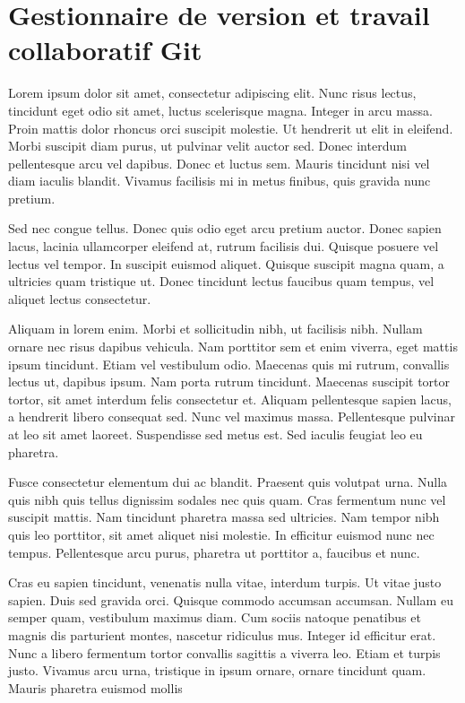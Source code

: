 \documentclass{report}
\begin{document}
        \section{Gestionnaire de version et travail collaboratif Git}
            Lorem ipsum dolor sit amet, consectetur adipiscing elit. Nunc risus lectus, tincidunt eget odio sit amet, luctus scelerisque magna. Integer in arcu massa. Proin mattis dolor rhoncus orci suscipit molestie. Ut hendrerit ut elit in eleifend. Morbi suscipit diam purus, ut pulvinar velit auctor sed. Donec interdum pellentesque arcu vel dapibus. Donec et luctus sem. Mauris tincidunt nisi vel diam iaculis blandit. Vivamus facilisis mi in metus finibus, quis gravida nunc pretium.

            Sed nec congue tellus. Donec quis odio eget arcu pretium auctor. Donec sapien lacus, lacinia ullamcorper eleifend at, rutrum facilisis dui. Quisque posuere vel lectus vel tempor. In suscipit euismod aliquet. Quisque suscipit magna quam, a ultricies quam tristique ut. Donec tincidunt lectus faucibus quam tempus, vel aliquet lectus consectetur.

            Aliquam in lorem enim. Morbi et sollicitudin nibh, ut facilisis nibh. Nullam ornare nec risus dapibus vehicula. Nam porttitor sem et enim viverra, eget mattis ipsum tincidunt. Etiam vel vestibulum odio. Maecenas quis mi rutrum, convallis lectus ut, dapibus ipsum. Nam porta rutrum tincidunt. Maecenas suscipit tortor tortor, sit amet interdum felis consectetur et. Aliquam pellentesque sapien lacus, a hendrerit libero consequat sed. Nunc vel maximus massa. Pellentesque pulvinar at leo sit amet laoreet. Suspendisse sed metus est. Sed iaculis feugiat leo eu pharetra.

            Fusce consectetur elementum dui ac blandit. Praesent quis volutpat urna. Nulla quis nibh quis tellus dignissim sodales nec quis quam. Cras fermentum nunc vel suscipit mattis. Nam tincidunt pharetra massa sed ultricies. Nam tempor nibh quis leo porttitor, sit amet aliquet nisi molestie. In efficitur euismod nunc nec tempus. Pellentesque arcu purus, pharetra ut porttitor a, faucibus et nunc.

            Cras eu sapien tincidunt, venenatis nulla vitae, interdum turpis. Ut vitae justo sapien. Duis sed gravida orci. Quisque commodo accumsan accumsan. Nullam eu semper quam, vestibulum maximus diam. Cum sociis natoque penatibus et magnis dis parturient montes, nascetur ridiculus mus. Integer id efficitur erat. Nunc a libero fermentum tortor convallis sagittis a viverra leo. Etiam et turpis justo. Vivamus arcu urna, tristique in ipsum ornare, ornare tincidunt quam. Mauris pharetra euismod mollis
\end{document}
